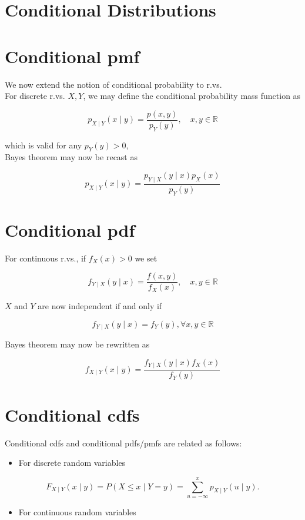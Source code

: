 \documentclass[10pt]{article}
\begin{document}
\section*{Conditional Distributions}
\section*{Conditional pmf}
We now extend the notion of conditional probability to r.vs.\\
For discrete r.vs. $X, Y$, we may define the conditional probability mass function as

$$
p_{X \mid Y}(x \mid y)=\frac{p(x, y)}{p_{Y}(y)}, \quad x, y \in \mathbb{R}
$$

which is valid for any $p_{Y}(y)>0$,\\
Bayes theorem may now be recast as

$$
p_{X \mid Y}(x \mid y)=\frac{p_{Y \mid X}(y \mid x) p_{X}(x)}{p_{Y}(y)}
$$

\section*{Conditional pdf}
For continuous r.vs., if $f_{X}(x)>0$ we set

$$
f_{Y \mid X}(y \mid x)=\frac{f(x, y)}{f_{X}(x)}, \quad x, y \in \mathbb{R}
$$

$X$ and $Y$ are now independent if and only if

$$
f_{Y \mid X}(y \mid x)=f_{Y}(y), \forall x, y \in \mathbb{R}
$$

Bayes theorem may now be rewritten as

$$
f_{X \mid Y}(x \mid y)=\frac{f_{Y \mid X}(y \mid x) f_{X}(x)}{f_{Y}(y)}
$$

\section*{Conditional cdfs}
Conditional cdfs and conditional pdfs/pmfs are related as follows:

\begin{itemize}
  \item For discrete random variables
\end{itemize}

$$
F_{X \mid Y}(x \mid y)=P(X \leq x \mid Y=y)=\sum_{u=-\infty}^{x} p_{X \mid Y}(u \mid y) .
$$

\begin{itemize}
  \item For continuous random variables
\end{itemize}
\end{document}
